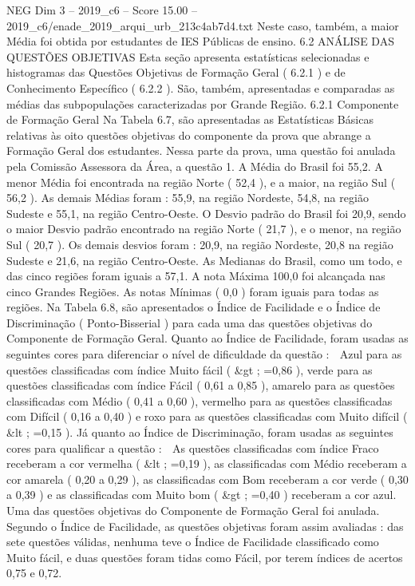 \begin{textsample}{NEG Dim 3 – 2019\_c6 – Score 15.00 – 2019\_c6/enade\_2019\_arqui\_urb\_213c4ab7d4.txt}
Neste caso, também, a maior Média foi obtida por estudantes de IES Públicas de ensino. 6.2 ANÁLISE DAS QUESTÕES OBJETIVAS Esta seção apresenta estatísticas selecionadas e histogramas das Questões Objetivas de Formação Geral ( 6.2.1 ) e de Conhecimento Específico ( 6.2.2 ).
São, também, apresentadas e comparadas as médias das subpopulações caracterizadas por Grande Região. 6.2.1 Componente de Formação Geral Na Tabela 6.7, são apresentadas as Estatísticas Básicas relativas às oito questões objetivas do componente da prova que abrange a Formação Geral dos estudantes.
Nessa parte da prova, uma questão foi anulada pela Comissão Assessora da Área, a questão 1.
A Média do Brasil foi 55,2.
A menor Média foi encontrada na região Norte ( 52,4 ), e a maior, na região Sul ( 56,2 ).
As demais Médias foram : 55,9, na região Nordeste, 54,8, na região Sudeste e 55,1, na região Centro-Oeste.
O Desvio padrão do Brasil foi 20,9, sendo o maior Desvio padrão encontrado na região Norte ( 21,7 ), e o menor, na região Sul ( 20,7 ).
Os demais desvios foram : 20,9, na região Nordeste, 20,8 na região Sudeste e 21,6, na região Centro-Oeste.
As Medianas do Brasil, como um todo, e das cinco regiões foram iguais a 57,1.
A nota Máxima 100,0 foi alcançada nas cinco Grandes Regiões.
As notas Mínimas ( 0,0 ) foram iguais para todas as regiões.
Na Tabela 6.8, são apresentados o Índice de Facilidade e o Índice de Discriminação ( Ponto-Bisserial ) para cada uma das questões objetivas do Componente de Formação Geral.
Quanto ao Índice de Facilidade, foram usadas as seguintes cores para diferenciar o nível de dificuldade da questão :  Azul para as questões classificadas com índice Muito fácil ( \&gt ; =0,86 ), verde para as questões classificadas com índice Fácil ( 0,61 a 0,85 ), amarelo para as questões classificadas com Médio ( 0,41 a 0,60 ), vermelho para as questões classificadas com Difícil ( 0,16 a 0,40 ) e roxo para as questões classificadas com Muito difícil ( \&lt ; =0,15 ).
Já quanto ao Índice de Discriminação, foram usadas as seguintes cores para qualificar a questão :  As questões classificadas com índice Fraco receberam a cor vermelha ( \&lt ; =0,19 ), as classificadas com Médio receberam a cor amarela ( 0,20 a 0,29 ), as classificadas com Bom receberam a cor verde ( 0,30 a 0,39 ) e as classificadas com Muito bom ( \&gt ; =0,40 ) receberam a cor azul.
Uma das questões objetivas do Componente de Formação Geral foi anulada.
Segundo o Índice de Facilidade, as questões objetivas foram assim avaliadas : das sete questões válidas, nenhuma teve o Índice de Facilidade classificado como Muito fácil, e duas questões foram tidas como Fácil, por terem índices de acertos 0,75 e 0,72.

\end{textsample}
